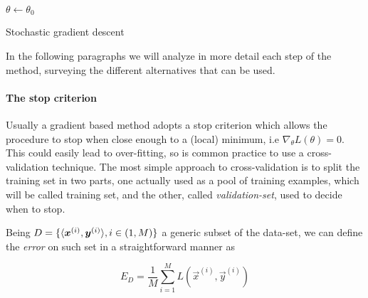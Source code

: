 \begin{algorithm}[]
  
 \BlankLine
 
 $\theta \gets \theta_0$\\
\caption{Stochastic gradient descent}
\label{algo:sgd}
\end{algorithm}

In the following paragraphs we will analyze in more detail each step of the method, surveying the different alternatives 
that can be used.

\paragraph{The stop criterion}

Usually a gradient based method adopts a stop criterion which allows the procedure to stop when close enough to a (local) 
minimum, i.e $\nabla_\theta L(\theta)=0$.  This could easily lead to over-fitting, so is common practice to use a 
cross-validation technique. The most simple approach to cross-validation is to split the training set in two parts, one actually used as a pool of training examples, which will be called training set, and the other, called \textit{validation-set}, used to decide when to stop.

Being $D=\{\langle\boldsymbol{x}^{(i)},\boldsymbol{y}^{(i)}\rangle, i\in(1,M)\}$ a generic subset of the data-set, we can define the \textit{error} on such set in a straightforward manner as 

\begin{equation}
 E_D = \frac{1}{M} \sum_{i=1}^M  L(\vec{x}^{(i)},\vec{y}^{(i)})
\end{equation}

